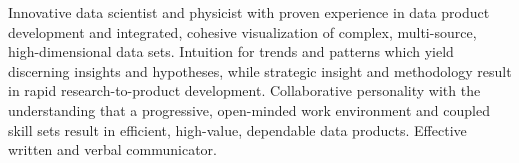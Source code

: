 
\vspace{0.2cm}
\noindent Innovative data scientist and physicist with proven experience in 
data product development and integrated, cohesive visualization of complex,
multi-source, high-dimensional data sets. Intuition for trends and
patterns which yield discerning insights and hypotheses, while
strategic insight and methodology result in rapid research-to-product
development. Collaborative personality with the understanding that 
a progressive, open-minded work environment and
coupled skill sets result in efficient, high-value, dependable data
products. Effective written and verbal communicator.
